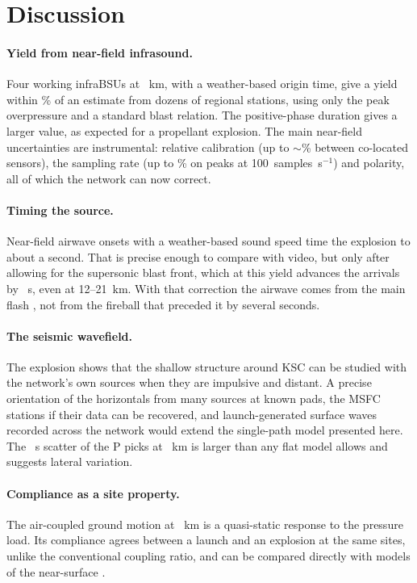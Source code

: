 \documentclass[]{seismica}
\begin{document}
\section{Discussion}

\paragraph{Yield from near-field infrasound.} Four working infraBSUs at
\NGdistRangeRound~km, with a weather-based origin time, give a yield within \NGyieldVsSilber\% of
an estimate from dozens of regional stations, using only the peak
overpressure and a standard blast relation. The positive-phase duration
gives a larger value, as expected for a propellant explosion. The main
near-field uncertainties are instrumental: relative calibration (up to
$\sim$\NGbCal\% between co-located sensors), the sampling rate (up to \NGdecMax\% on
peaks at 100~samples~s$^{-1}$) and polarity, all of which the network
can now correct.

\paragraph{Timing the source.} Near-field airwave onsets with a
weather-based sound speed time the explosion to about a second. That is
precise enough to compare with video, but only after allowing for the
supersonic blast front, which at this yield advances the arrivals by
\NGadvanceAll~s, even at 12--21~km. With that correction the airwave
comes from the main flash \citep{silber_scamfer_newglenn_2026}, not from
the fireball that preceded it by several seconds.

\paragraph{The seismic wavefield.} The explosion shows that the shallow
structure around KSC can be studied with the network's own sources when
they are impulsive and distant. A precise orientation of the
horizontals from many sources at known pads, the MSFC stations if their
data can be recovered, and launch-generated surface waves recorded
across the network would extend the single-path model presented here.
The \NGpScatter~s scatter of the P picks at \NGfarRange~km is larger than any flat
model allows and suggests lateral variation.

\paragraph{Compliance as a site property.} The air-coupled ground motion
at \NGdistRangeRound~km is a quasi-static response to the pressure load. Its
compliance agrees between a launch and an explosion at the same sites,
unlike the conventional coupling ratio, and can be compared directly
with models of the near-surface \citep{novoselov_ground_coupling_2020}.
\end{document}
